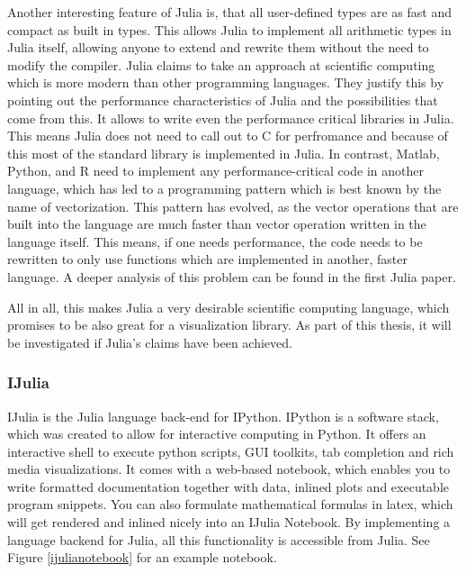 Another interesting feature of Julia is, that all user-defined types are as fast and compact as built in types.
This allows Julia to implement all arithmetic types in Julia itself, allowing anyone to extend and rewrite them without the need to modify the compiler.
Julia claims to take an approach at scientific computing which is more modern than other programming languages.
They justify this by pointing out the performance characteristics of Julia and the possibilities that come from this\cite{2013arXiv1312.1431L}\cite{2012arXiv1209.5145B}. 
It allows to write even the performance critical libraries in Julia. 
This means Julia does not need to call out to C for perfromance and because of this most of the standard library is implemented in Julia.
In contrast, Matlab, Python, and R need to implement any performance-critical code in another language, which has led to a programming pattern which is best known by the name of vectorization. This pattern has evolved, as the vector operations that are built into the language are much faster than vector operation written in the language itself.
This means, if one needs performance, the code needs to be rewritten to only use functions which are implemented in another, faster language.
A deeper analysis of this problem can be found in the first Julia paper\cite{2012arXiv1209.5145B}.

All in all, this makes Julia a very desirable scientific computing language, which promises to be also great for a visualization library.
As part of this thesis, it will be investigated if Julia's claims\cite{WhyJulia} have been achieved.



\subsubsection{IJulia}
IJulia is the Julia language back-end for IPython.
IPython is a software stack, which was created to allow for interactive computing in Python.
It offers an interactive shell to execute python scripts, \ac{GUI} toolkits, tab completion and rich media visualizations.
It comes with a web-based notebook, which enables you to write formatted documentation together with data, inlined plots and executable program snippets. You can also formulate mathematical formulas in latex, which will get rendered and inlined nicely into an IJulia Notebook. By implementing a language backend for Julia, all this functionality is accessible from Julia.
See Figure \cref{ijulianotebook} for an example notebook.

